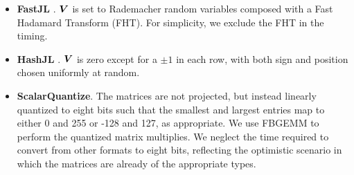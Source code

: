 \begin{itemize}
    \item \textbf{FastJL} \cite{fastjl}. $\bm{V}$ is set to Rademacher random variables composed with a Fast Hadamard Transform (FHT). For simplicity, we exclude the FHT in the timing.
    \item \textbf{HashJL} \cite{hashjl}. $\bm{V}$ is zero except for a $\pm 1$ in each row, with both sign and position chosen uniformly at random.
    \item \textbf{ScalarQuantize}. The matrices are not projected, but instead linearly quantized to eight bits such that the smallest and largest entries map to
    either 0 and 255 or -128 and 127, as appropriate.
    We use FBGEMM \cite{fbgemm} to perform the quantized matrix multiplies. We neglect the time required to convert from other formats to eight bits, reflecting the optimistic scenario in which the matrices are already of the appropriate types.

\end{itemize}
